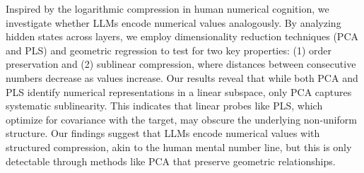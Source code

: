 Inspired by the logarithmic compression in human numerical cognition, we investigate whether LLMs encode numerical values analogously. By analyzing hidden states across layers, we employ dimensionality reduction techniques (PCA and PLS) and geometric regression to test for two key properties: (1) order preservation and (2) sublinear compression, where distances between consecutive numbers decrease as values increase. Our results reveal that while both PCA and PLS identify numerical representations in a linear subspace, only PCA captures systematic sublinearity. This indicates that linear probes like PLS, which optimize for covariance with the target, may obscure the underlying non-uniform structure. Our findings suggest that LLMs encode numerical values with structured compression, akin to the human mental number line, but this is only detectable through methods like PCA that preserve geometric relationships.